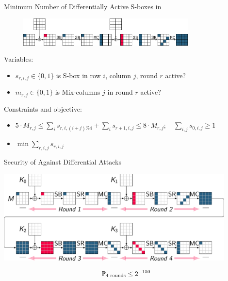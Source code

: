 \begin{frame}{Minimum Number of Differentially Active S-boxes in }
\vspace{-0.2cm}
\begin{figure}
\centering
\includegraphics[width=0.8\textwidth]{./figures/aes2rtruncdiff.pdf}
\end{figure}
\textcolor{tugred}{Variables}:
\begin{itemize}
\footnotesize
  \item $s_{r, i, j} \in \{0, 1\}$ is S-box in row $i$, column $j$, round $r$ active?
  \item $m_{r, j}\in \{0, 1\}$ is Mix-columns $j$ in round $r$ active?
\end{itemize}
\textcolor{tugblue}{Constraints and objective}:
\begin{itemize}
\footnotesize
  \item $5 \cdot M_{r, j} \leq \sum_{i} s_{r, i, (i + j)\%4} + \sum_{i}s_{r + 1, i, j} \leq 8 \cdot M_{r, j}; \quad \sum_{i, j} s_{0, i, j} \geq 1$
  \item $\min \sum_{r, i, j} s_{r, i, j}$
\end{itemize}
\end{frame}

\begin{frame}{Security of  Against Differential Attacks}
\vspace{-0.25cm}
\begin{center}
\includegraphics[width=0.9\textwidth]{./figures/aes_4r.pdf}
\end{center}
$$\mathbb{P}_{\text{4 rounds}} \leq 2^{-150}$$
\end{frame}

